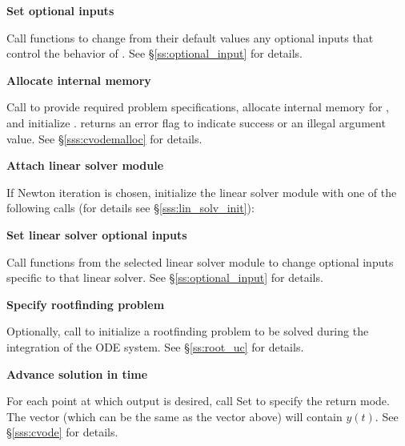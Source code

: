 \begin{Steps}
\item
  {\bf Set optional inputs}

  Call  functions to change from their default values any
  optional inputs that control the behavior of {\cvode}.
  See \S\ref{ss:optional_input} for details.

\item\label{i:cvode_malloc} 
  {\bf Allocate internal memory}

  Call  
  to provide required problem specifications,
  allocate internal memory for {\cvode}, 
  and initialize {\cvode}.
   returns an error flag to indicate success or an illegal
  argument value.  See \S\ref{sss:cvodemalloc} for details.
  
\item\label{i:lin_solver} 
  {\bf Attach linear solver module}

  If Newton iteration is chosen, initialize the linear solver module
  with one of the following calls (for details see \S\ref{sss:lin_solv_init}):

  {\s} 

  {\s} 


  
\item
  {\bf Set linear solver optional inputs}

  Call  functions from the selected linear solver module to
  change optional inputs specific to that linear solver.
  See \S\ref{ss:optional_input} for details.

\item
  {\bf Specify rootfinding problem}

  Optionally, call  to initialize a rootfinding problem
  to be solved during the integration of the ODE system.
  See \S\ref{ss:root_uc} for details.

\item
  {\bf Advance solution in time}

  For each point at which output is desired, call
  Set  to specify the return mode.
  The vector  (which can be the same as
  the vector  above) will contain $y(t)$.
  See \S\ref{sss:cvode} for details.
  

\end{Steps}
